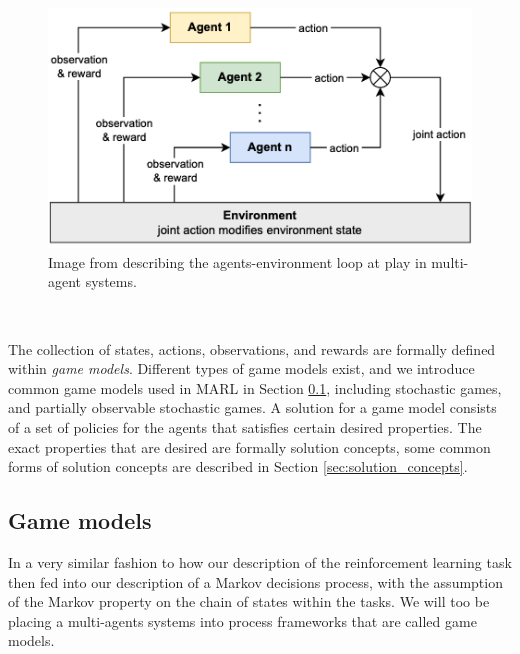 \documentclass{article}
\begin{document}
\begin{figure}
	\centering
	\includegraphics[scale=0.6]{images/multiple_agent_environment.png}
	\caption{Image from \citet{albrecht2024marl} describing the agents-environment loop at play in multi-agent systems.}
	\label{fig:agents_environment_loop}
\end{figure}

\

The collection of states, actions, observations, and rewards are formally defined within \textit{game models}. Different types of game models exist, and we introduce common game models used in MARL in Section \ref{sec:game_models}, including  stochastic games, and partially observable stochastic games. A solution for a game model consists of a set of policies for the agents that satisfies certain desired properties. The exact properties that are desired are formally solution concepts, some common forms of solution concepts are described in Section \ref{sec:solution_concepts}.

\subsection{Game models}\label{sec:game_models}

In a very similar fashion to how our description of the reinforcement learning task then fed into our description of a Markov decisions process, with the assumption of the Markov property on the chain of states within the tasks. We will too be placing a multi-agents systems into process frameworks that are called game models. 

\
\end{document}
